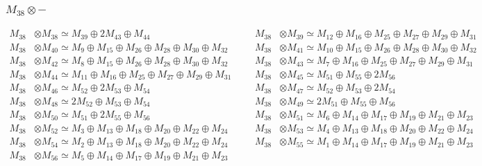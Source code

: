 \subsubsection{$ M_{38}\otimes -$}
\begin{align*}
M_{38} &\otimes M_{38} \simeq M_{39} \oplus 2M_{43} \oplus M_{44} &&& M_{38} &\otimes M_{39} \simeq M_{12} \oplus M_{16} \oplus M_{25} \oplus M_{27} \oplus M_{29} \oplus M_{31}\\
M_{38} &\otimes M_{40} \simeq M_{9} \oplus M_{15} \oplus M_{26} \oplus M_{28} \oplus M_{30} \oplus M_{32} &&& M_{38} &\otimes M_{41} \simeq M_{10} \oplus M_{15} \oplus M_{26} \oplus M_{28} \oplus M_{30} \oplus M_{32}\\
M_{38} &\otimes M_{42} \simeq M_{8} \oplus M_{15} \oplus M_{26} \oplus M_{28} \oplus M_{30} \oplus M_{32} &&& M_{38} &\otimes M_{43} \simeq M_{7} \oplus M_{16} \oplus M_{25} \oplus M_{27} \oplus M_{29} \oplus M_{31}\\
M_{38} &\otimes M_{44} \simeq M_{11} \oplus M_{16} \oplus M_{25} \oplus M_{27} \oplus M_{29} \oplus M_{31} &&& M_{38} &\otimes M_{45} \simeq M_{51} \oplus M_{55} \oplus 2M_{56}\\
M_{38} &\otimes M_{46} \simeq M_{52} \oplus 2M_{53} \oplus M_{54} &&& M_{38} &\otimes M_{47} \simeq M_{52} \oplus M_{53} \oplus 2M_{54}\\
M_{38} &\otimes M_{48} \simeq 2M_{52} \oplus M_{53} \oplus M_{54} &&& M_{38} &\otimes M_{49} \simeq 2M_{51} \oplus M_{55} \oplus M_{56}\\
M_{38} &\otimes M_{50} \simeq M_{51} \oplus 2M_{55} \oplus M_{56} &&& M_{38} &\otimes M_{51} \simeq M_{6} \oplus M_{14} \oplus M_{17} \oplus M_{19} \oplus M_{21} \oplus M_{23}\\
M_{38} &\otimes M_{52} \simeq M_{3} \oplus M_{13} \oplus M_{18} \oplus M_{20} \oplus M_{22} \oplus M_{24} &&& M_{38} &\otimes M_{53} \simeq M_{4} \oplus M_{13} \oplus M_{18} \oplus M_{20} \oplus M_{22} \oplus M_{24}\\
M_{38} &\otimes M_{54} \simeq M_{2} \oplus M_{13} \oplus M_{18} \oplus M_{20} \oplus M_{22} \oplus M_{24} &&& M_{38} &\otimes M_{55} \simeq M_{1} \oplus M_{14} \oplus M_{17} \oplus M_{19} \oplus M_{21} \oplus M_{23}\\
M_{38} &\otimes M_{56} \simeq M_{5} \oplus M_{14} \oplus M_{17} \oplus M_{19} \oplus M_{21} \oplus M_{23}
\end{align*}

